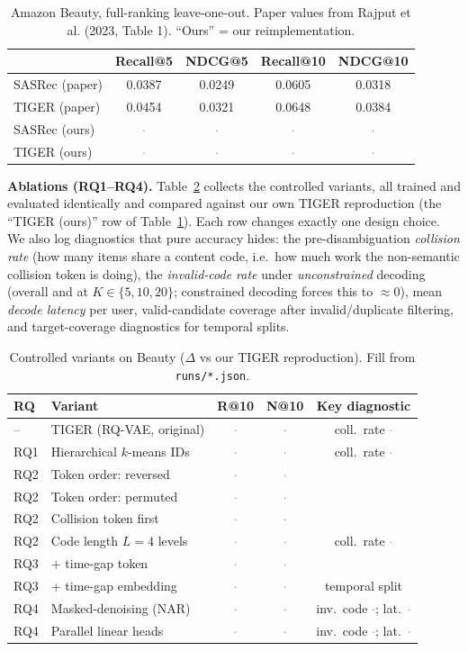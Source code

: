 \documentclass[10pt]{article}
\newcommand{\fic}{\textcolor{gray}{$\cdot$}} %
\begin{document}
\begin{table}[h]
\centering
\small
\caption{Amazon Beauty, full-ranking leave-one-out. Paper values from Rajput et
al. (2023, Table 1). ``Ours'' = our reimplementation.}
\label{tab:main}
\begin{tabular}{l cccc}
\toprule
& Recall@5 & NDCG@5 & Recall@10 & NDCG@10 \\
\midrule
SASRec (paper) & 0.0387 & 0.0249 & 0.0605 & 0.0318 \\
TIGER (paper)  & 0.0454 & 0.0321 & 0.0648 & 0.0384 \\
\midrule
SASRec (ours)  & \fic & \fic & \fic & \fic \\
TIGER (ours)   & \fic & \fic & \fic & \fic \\
\bottomrule
\end{tabular}
\end{table}

\textbf{Ablations (RQ1--RQ4).} Table~\ref{tab:abl} collects the controlled
variants, all trained and evaluated identically and compared against our own
TIGER reproduction (the ``TIGER (ours)'' row of Table~\ref{tab:main}). Each row
changes exactly one design choice. We also log diagnostics that pure accuracy
hides: the pre-disambiguation \emph{collision rate} (how many items share a
content code, i.e.\ how much work the non-semantic collision token is doing), the
\emph{invalid-code rate} under \emph{unconstrained} decoding (overall and at
$K\in\{5,10,20\}$; constrained decoding forces this to $\approx0$), mean
\emph{decode latency} per user, valid-candidate coverage after invalid/duplicate
filtering, and target-coverage diagnostics for temporal splits.

\begin{table}[h]
\centering
\small
\caption{Controlled variants on Beauty ($\Delta$ vs our TIGER reproduction).
Fill from \texttt{runs/*.json}.}
\label{tab:abl}
\begin{tabular}{l l cc c}
\toprule
RQ & Variant & R@10 & N@10 & Key diagnostic \\
\midrule
-- & TIGER (RQ-VAE, original) & \fic & \fic & coll.\ rate \fic \\
RQ1 & Hierarchical $k$-means IDs & \fic & \fic & coll.\ rate \fic \\
RQ2 & Token order: reversed & \fic & \fic & \\
RQ2 & Token order: permuted & \fic & \fic & \\
RQ2 & Collision token first & \fic & \fic & \\
RQ2 & Code length $L{=}4$ levels & \fic & \fic & coll.\ rate \fic \\
RQ3 & + time-gap token & \fic & \fic & \\
RQ3 & + time-gap embedding & \fic & \fic & temporal split \\
RQ4 & Masked-denoising (NAR) & \fic & \fic & inv.\ code \fic; lat.\ \fic \\
RQ4 & Parallel linear heads & \fic & \fic & inv.\ code \fic; lat.\ \fic \\
\bottomrule
\end{tabular}
\end{table}
\end{document}
